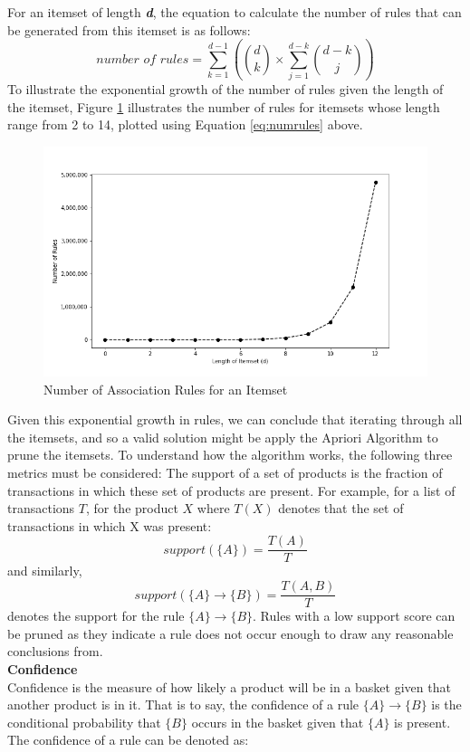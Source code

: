 \documentclass[paper=a4,fontsize=11pt]{report}	%
\newcommand{\setA}{\{A\}}
\newcommand{\setB}{\{B\}}
\newcommand{\abrule}{\setA\rightarrow\setB}
\begin{document}
For an itemset of length \textit{\textbf{d}}, the equation \cite{num_rules} to calculate the number of rules that can be generated from this itemset is as follows:
\begin{equation}
\textit{number of rules} = \sum\limits_{k=1}^{d-1} \left(\binom{d}{k} \times \sum\limits_{j=1}^{d-k}\binom{d-k}{j}  \right)
\label{eq:numrules}
\end{equation}
To illustrate the exponential growth of the number of rules given the length of the itemset, Figure \ref{fig:numrules} illustrates the number of rules for itemsets whose length range from 2 to 14, plotted using Equation \ref{eq:numrules} above.
\begin{figure}[H]
\centering
\includegraphics[scale=0.6]{numrules}
\caption{Number of Association Rules for an Itemset}
\label{fig:numrules}
\end{figure}
Given this exponential growth in rules, we can conclude that iterating through all the itemsets, and so a valid solution might be apply the Apriori Algorithm to prune the itemsets. To understand how the algorithm works, the following three metrics must be considered:
The support of a set of products is the fraction of transactions in which these set of products are present. For example,  for a list of transactions $T$, for the product $X$ where $T(X)$ denotes that the set of transactions in which X was present:
\[
\textit{support}(\{A\}) = \frac{T(A)}{T}
\]
and similarly, 
\[
\textit{support}(\abrule) = \frac{T(A,B)}{T}
\]
denotes the support for the rule $\abrule$. Rules with a low support score can be pruned as they indicate a rule does not occur enough to draw any reasonable conclusions from.
\\\textbf{Confidence}\\
Confidence is the measure of how likely a product will be in a basket given that another product is in it. That is to say,  the confidence of a rule $\abrule$ is the conditional probability that $\setB$ occurs in the basket given that $\setA$ is present. The confidence of a rule can be denoted as:
\end{document}

